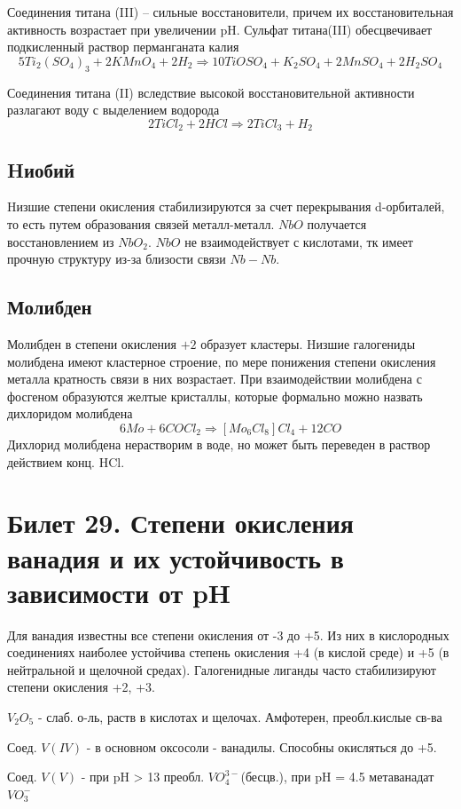 \documentclass[11pt]{article}
\begin{document}
Соединения титана (III) – сильные восстановители, причем их восстановительная активность возрастает при увеличении pH. Сульфат титана(III) обесцвечивает подкисленный раствор перманганата калия 
$$5Ti_2(SO_4)_3 + 2KMnO_4 +2H_2  \Rightarrow 10TiOSO_4 + K_2SO_4 + 2MnSO_4 + 2H_2SO_4$$
 
Соединения титана (II) вследствие высокой
восстановительной активности разлагают воду с выделением водорода 
$$2TiCl_2+ 2HCl  \Rightarrow 2TiCl_3+ H_2$$

\subsection{Hиобий}

Hизшие степени окисления стабилизируются за счет перекрывания d-орбиталей, то есть
путем образования связей металл-металл. $NbO$ получается восстановлением из $NbO_2$. $NbO$
не взаимодействует с кислотами, тк имеет прочную структуру из-за близости связи $Nb-Nb$.

\subsection{Молибден}

Молибден в степени окисления $+2$ образует кластеры. Hизшие галогениды молибдена
имеют кластерное строение, по мере понижения степени окисления металла кратность
связи в них возрастает. При взаимодействии молибдена с фосгеном образуются желтые
кристаллы, которые формально можно назвать дихлоридом молибдена 
$$6Mo + 6COCl_2  \Rightarrow[Mo_6Cl_8]Cl_4 + 12CO$$
 Дихлорид молибдена нерастворим в воде, но может быть переведен
в раствор действием конц. HCl.

\section{Билет 29. Степени окисления ванадия и их устойчивость в зависимости от pH}
Для ванадия известны все степени окисления от -3 до +5. Из них в кислородных
соединениях наиболее устойчива степень окисления +4 (в кислой среде) и +5 (в
нейтральной и щелочной средах). Галогенидные лиганды часто стабилизируют степени
окисления +2, +3. 

$V_2O_5$ - слаб. о-ль, раств в кислотах и щелочах. Амфотерен, преобл.кислые св-ва

Соед. $V(IV)$ - в основном оксосоли - ванадилы.
Способны окисляться до +5.

Соед. $V(V)$ - при pH > 13 преобл. $VO_4^{3-}$(бесцв.), при pH = 4.5 метаванадат $VO_3^-$
\end{document}
